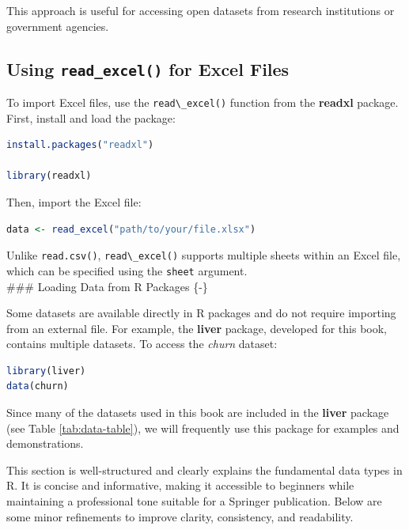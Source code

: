 \documentclass[
]{book}
\newcommand{\passthrough}[1]{#1}
\theoremstyle{definition}
\theoremstyle{definition}
\theoremstyle{definition}
\theoremstyle{definition}
\theoremstyle{remark}
\begin{document}
This approach is useful for accessing open datasets from research institutions or government agencies.

\subsection*{\texorpdfstring{Using \texttt{read\_excel()} for Excel Files}{Using read\_excel() for Excel Files}}\label{using-read_excel-for-excel-files}

To import Excel files, use the \passthrough{\lstinline!read\_excel()!} function from the \textbf{readxl} package. First, install and load the package:

\begin{lstlisting}[language=R]
install.packages("readxl")

library(readxl)
\end{lstlisting}

Then, import the Excel file:

\begin{lstlisting}[language=R]
data <- read_excel("path/to/your/file.xlsx")
\end{lstlisting}

Unlike \passthrough{\lstinline!read.csv()!}, \passthrough{\lstinline!read\_excel()!} supports multiple sheets within an Excel file, which can be specified using the \passthrough{\lstinline!sheet!} argument.\\
\#\#\# Loading Data from R Packages \{-\}

Some datasets are available directly in R packages and do not require importing from an external file. For example, the \textbf{liver} package, developed for this book, contains multiple datasets. To access the \emph{churn} dataset:

\begin{lstlisting}[language=R]
library(liver)
data(churn)
\end{lstlisting}

Since many of the datasets used in this book are included in the \textbf{liver} package (see Table \ref{tab:data-table}), we will frequently use this package for examples and demonstrations.

This section is well-structured and clearly explains the fundamental data types in R. It is concise and informative, making it accessible to beginners while maintaining a professional tone suitable for a Springer publication. Below are some minor refinements to improve clarity, consistency, and readability.
\end{document}
